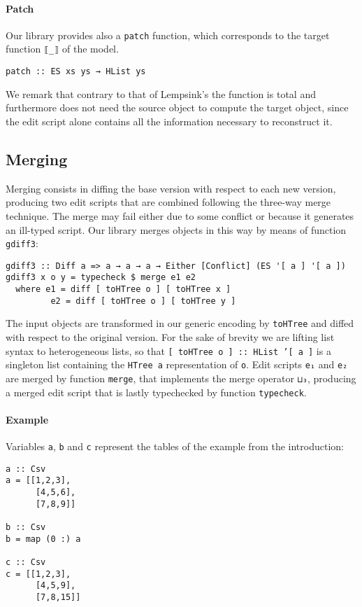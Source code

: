 \documentclass{sigplanconf}
\theoremstyle{plain}
\begin{document}
\paragraph{Patch}
Our library provides also a \texttt{patch} function, which corresponds to
the target function \texttt{⟦\_⟧} of the model.
\begin{verbatim}
patch :: ES xs ys → HList ys
\end{verbatim}

We remark that contrary to that of Lempsink's \cite{Lemp09} the function
is total and furthermore does not need the source object to compute the
target object, since the edit script alone contains all the information
necessary to reconstruct it.

\subsection{Merging}
Merging consists in diffing the base version with respect to each new
version, producing two edit scripts that are combined following the
three-way merge technique.
%
The merge may fail either due to some conflict or because it generates
an ill-typed script.
%
Our library merges objects in this way by means of function \texttt{gdiff3}:
\begin{verbatim}
gdiff3 :: Diff a => a → a → a → Either [Conflict] (ES '[ a ] '[ a ])
gdiff3 x o y = typecheck $ merge e1 e2
  where e1 = diff [ toHTree o ] [ toHTree x ]
         e2 = diff [ toHTree o ] [ toHTree y ]
\end{verbatim}
The input objects are transformed in our generic encoding by \texttt{toHTree}
and diffed with respect to the original version.
%
For the sake of brevity we are lifting list syntax to heterogeneous lists,
so that \texttt{[ toHTree o ] :: HList '[ a ]} is a singleton list
containing the \texttt{HTree a} representation of \texttt{o}.
%
Edit scripts \texttt{e₁} and \texttt{e₂} are merged by function
\texttt{merge}, that implements the merge operator \texttt{⊔₃},
producing a merged edit script that is lastly typechecked by function
\texttt{typecheck}.
%

\paragraph{Example}
Variables \texttt{a}, \texttt{b} and \texttt{c} represent the tables
of the example from the introduction:
\begin{verbatim}
a :: Csv
a = [[1,2,3],
      [4,5,6],
      [7,8,9]]

b :: Csv
b = map (0 :) a

c :: Csv
c = [[1,2,3],
      [4,5,9],
      [7,8,15]]
\end{verbatim}
\end{document}
